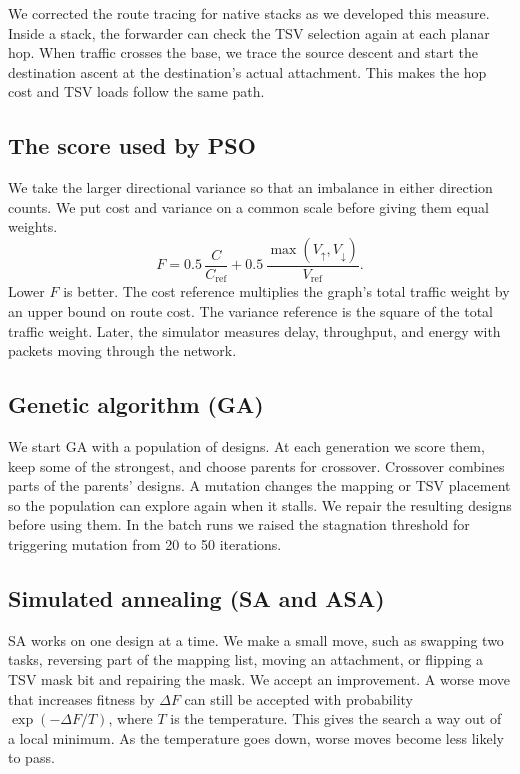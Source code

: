 \documentclass[12pt,a4paper]{article}
\begin{document}
We corrected the route tracing for native stacks as we developed this measure. Inside a stack, the forwarder can check the TSV selection again at each planar hop. When traffic crosses the base, we trace the source descent and start the destination ascent at the destination's actual attachment. This makes the hop cost and TSV loads follow the same path.

\subsection{The score used by PSO}

We take the larger directional variance so that an imbalance in either direction counts. We put cost and variance on a common scale before giving them equal weights.
\[
F=0.5\,\frac{C}{C_{\mathrm{ref}}}
  +0.5\,\frac{\max(V_{\uparrow},V_{\downarrow})}{V_{\mathrm{ref}}}.
\]
Lower \(F\) is better. The cost reference multiplies the graph's total traffic weight by an upper bound on route cost. The variance reference is the square of the total traffic weight. Later, the simulator measures delay, throughput, and energy with packets moving through the network.

\clearpage
\subsection{Genetic algorithm (GA)}

We start GA with a population of designs. At each generation we score them, keep some of the strongest, and choose parents for crossover. Crossover combines parts of the parents' designs. A mutation changes the mapping or TSV placement so the population can explore again when it stalls. We repair the resulting designs before using them. In the batch runs we raised the stagnation threshold for triggering mutation from 20 to 50 iterations.

\subsection{Simulated annealing (SA and ASA)}

SA works on one design at a time. We make a small move, such as swapping two tasks, reversing part of the mapping list, moving an attachment, or flipping a TSV mask bit and repairing the mask. We accept an improvement. A worse move that increases fitness by \(\Delta F\) can still be accepted with probability \(\exp(-\Delta F/T)\), where \(T\) is the temperature. This gives the search a way out of a local minimum. As the temperature goes down, worse moves become less likely to pass.
\end{document}
